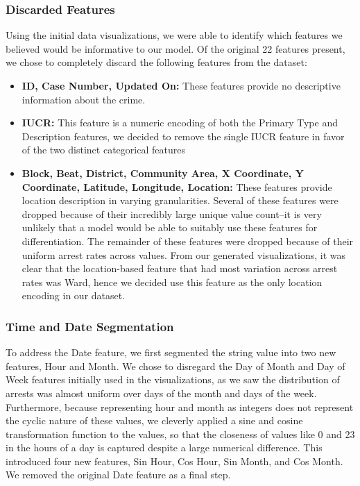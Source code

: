 \documentclass[10pt]{SelfArx} %
\begin{document}
        \subsubsection{Discarded Features}
        Using the initial data visualizations, we were able to identify which features we believed would be informative to our model. Of the original 22 features present, we chose to completely discard the following features from the dataset:
        \begin{itemize}
            \item \textbf{ID, Case Number, Updated On:} These features provide no descriptive information about the crime.
            \item \textbf{IUCR:} This feature is a numeric encoding of both the Primary Type and Description features, we decided to remove the single IUCR feature in favor of the two distinct categorical features
            \item \textbf{Block, Beat, District, Community Area, X Coordinate, Y Coordinate, Latitude, Longitude, Location:} These features provide location description in varying granularities. Several of these features were dropped because of their incredibly large unique value count--it is very unlikely that a model would be able to suitably use these features for differentiation. The remainder of these features were dropped because of their uniform arrest rates across values. From our generated visualizations, it was clear that the location-based feature that had most variation across arrest rates was Ward, hence we decided use this feature as the only location encoding in our dataset.
        \end{itemize}

        \subsubsection{Time and Date Segmentation}
        To address the Date feature, we first segmented the string value into two new features, Hour and Month. We chose to disregard the Day of Month and Day of Week features initially used in the visualizations, as we saw the distribution of arrests was almost uniform over days of the month and days of the week. Furthermore, because representing hour and month as integers does not represent the cyclic nature of these values, we cleverly applied a sine and cosine transformation function to the values, so that the closeness of values like 0 and 23 in the hours of a day is captured despite a large numerical difference. This introduced four new features, Sin Hour, Cos Hour, Sin Month, and Cos Month. We removed the original Date feature as a final step.
\end{document}
